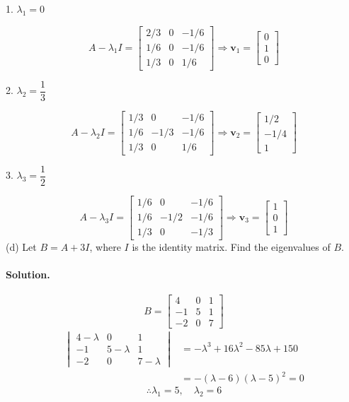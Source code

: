 1. $\lambda_1 = 0$

$$A - \lambda_1 I = \begin{bmatrix}
    2/3&0&-1/6\\
    1/6&0&-1/6\\
    1/3&0&1/6
\end{bmatrix} \Rightarrow \mathbf{v}_1=\begin{bmatrix}
    0\\1\\0
\end{bmatrix}$$

2. $\lambda_2 = \dfrac{1}{3}$

$$A - \lambda_2 I = \begin{bmatrix}
    1/3&0&-1/6\\
    1/6&-1/3&-1/6\\
    1/3&0&1/6
\end{bmatrix} \Rightarrow \mathbf{v}_2=\begin{bmatrix}
    1/2\\-1/4\\1
\end{bmatrix}$$

3. $\lambda_3 = \dfrac{1}{2}$

$$A - \lambda_3 I = \begin{bmatrix}
    1/6&0&-1/6\\
    1/6&-1/2&-1/6\\
    1/3&0&-1/3
\end{bmatrix} \Rightarrow \mathbf{v}_3=\begin{bmatrix}
    1\\0\\1
\end{bmatrix}$$
\newpage
(d) Let $B = A + 3I$, where $I$ is the identity matrix. Find the eigenvalues of $B$.
\paragraph{Solution.}
$$B = \begin{bmatrix}
    4&0&1\\
    -1&5&1\\
    -2&0&7
\end{bmatrix}$$
\begin{align*}
    \begin{vmatrix}
        4-\lambda&0&1\\
        -1&5-\lambda&1\\
        -2&0&7-\lambda
    \end{vmatrix} &= -\lambda^3 + 16\lambda^2 - 85\lambda + 150\\
    &= -(\lambda - 6)(\lambda - 5)^2 = 0
\end{align*}
$$\therefore \lambda_1 = 5,\quad \lambda_2 = 6$$

